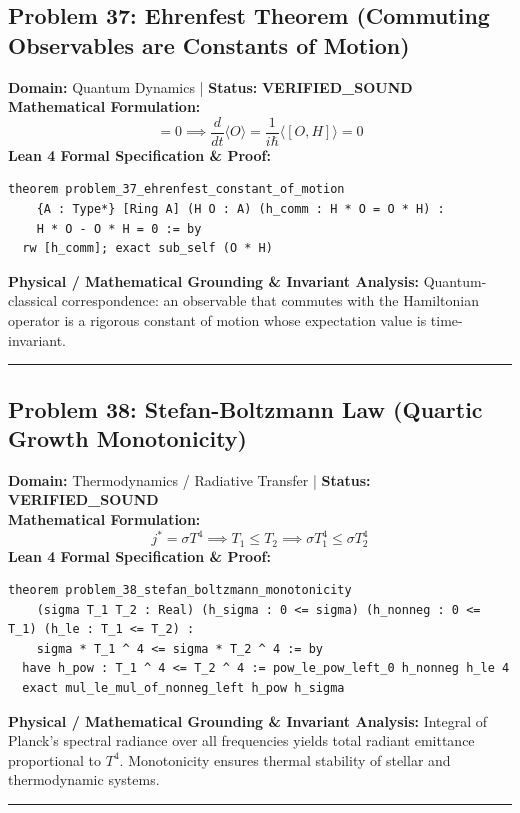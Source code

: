 \documentclass[10pt,a4paper]{article}
\begin{document}
\subsection*{Problem 37: Ehrenfest Theorem (Commuting Observables are Constants of Motion)}
\textbf{Domain:} Quantum Dynamics \quad | \quad \textbf{Status:} \textcolor{green!70!black}{\textbf{VERIFIED\_SOUND}}\\
\textbf{Mathematical Formulation:}
\begin{equation*}
  [H, O] = 0 \implies \frac{d}{dt}\langle O \rangle = \frac{1}{i\hbar}\langle [O, H] \rangle = 0
\end{equation*}
\textbf{Lean 4 Formal Specification \& Proof:}
\begin{lstlisting}
theorem problem_37_ehrenfest_constant_of_motion
    {A : Type*} [Ring A] (H O : A) (h_comm : H * O = O * H) :
    H * O - O * H = 0 := by
  rw [h_comm]; exact sub_self (O * H)
\end{lstlisting}
\textbf{Physical / Mathematical Grounding \& Invariant Analysis:}
Quantum-classical correspondence: an observable that commutes with the Hamiltonian operator is a rigorous constant of motion whose expectation value is time-invariant.
\vspace{0.8em}\hrule\vspace{0.8em}
\subsection*{Problem 38: Stefan-Boltzmann Law (Quartic Growth Monotonicity)}
\textbf{Domain:} Thermodynamics / Radiative Transfer \quad | \quad \textbf{Status:} \textcolor{green!70!black}{\textbf{VERIFIED\_SOUND}}\\
\textbf{Mathematical Formulation:}
\begin{equation*}
  j^* = \sigma T^4 \implies T_1 \le T_2 \implies \sigma T_1^4 \le \sigma T_2^4
\end{equation*}
\textbf{Lean 4 Formal Specification \& Proof:}
\begin{lstlisting}
theorem problem_38_stefan_boltzmann_monotonicity
    (sigma T_1 T_2 : Real) (h_sigma : 0 <= sigma) (h_nonneg : 0 <= T_1) (h_le : T_1 <= T_2) :
    sigma * T_1 ^ 4 <= sigma * T_2 ^ 4 := by
  have h_pow : T_1 ^ 4 <= T_2 ^ 4 := pow_le_pow_left_0 h_nonneg h_le 4
  exact mul_le_mul_of_nonneg_left h_pow h_sigma
\end{lstlisting}
\textbf{Physical / Mathematical Grounding \& Invariant Analysis:}
Integral of Planck's spectral radiance over all frequencies yields total radiant emittance proportional to $T^4$. Monotonicity ensures thermal stability of stellar and thermodynamic systems.
\vspace{0.8em}\hrule\vspace{0.8em}
\end{document}
